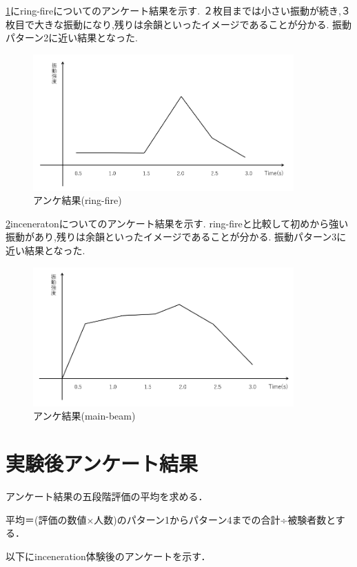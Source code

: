 \ref{ringA}にring-fireについてのアンケート結果を示す.
２枚目までは小さい振動が続き,３枚目で大きな振動になり,残りは余韻といったイメージであることが分かる.
振動パターン2に近い結果となった.
\begin{figure}[h]
\centering
\includegraphics[clip,width=10cm]{fig/ringfireAve.png}
\caption{アンケ結果(ring-fire)}\label{ringA}
\end{figure}



\ref{mainA}inceneratonについてのアンケート結果を示す.
ring-fireと比較して初めから強い振動があり,残りは余韻といったイメージであることが分かる.
振動パターン3に近い結果となった.
\begin{figure}[h]
\centering
\includegraphics[clip,width=10cm]{fig/mainbeamAve.png}
\caption{アンケ結果(main-beam)}\label{mainA}
\end{figure}

\newpage

\section{実験後アンケート結果}
アンケート結果の五段階評価の平均を求める．

平均＝(評価の数値×人数)のパターン1からパターン4までの合計÷被験者数とする．

以下にinceneration体験後のアンケートを示す．

